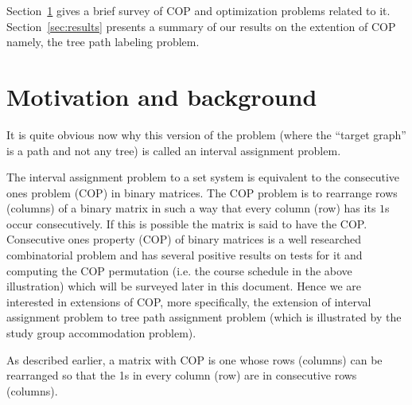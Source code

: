 \documentclass[MS,synopsis]{iitmdiss}
\begin{document}

Section~\ref{sec:motivation} gives a brief survey of COP and
optimization problems related to it.  Section~\ref{sec:results}
presents a summary of our results on the extention of COP namely, the
tree path labeling problem.

\section{Motivation and background}
\label{sec:motivation}


It is quite obvious now why this version of the
problem (where the ``target graph'' is a path and not any
tree) is called an interval assignment
problem.

The interval assignment problem to a set system is equivalent to the
consecutive ones problem (COP) in binary matrices\cite{wlh02,
  nsnrs09}.  The COP problem is to rearrange rows (columns) of a
binary matrix in such a way that every column (row) has its $1$s occur
consecutively. If this is possible the matrix is said to have the COP.
Consecutive ones property (COP) of binary matrices is a well
researched combinatorial problem and has several positive results on
tests for it and computing the COP permutation (i.e. the course
schedule in the above illustration) which will be surveyed later in
this document. Hence we are interested in extensions of COP, more
specifically, the extension of interval assignment problem to tree
path assignment problem (which is illustrated by the study group
accommodation problem).


As described earlier, 
a matrix with COP is one whose rows (columns)
can be rearranged so that the 1s in every column (row) are in
consecutive rows (columns).
\end{document}
